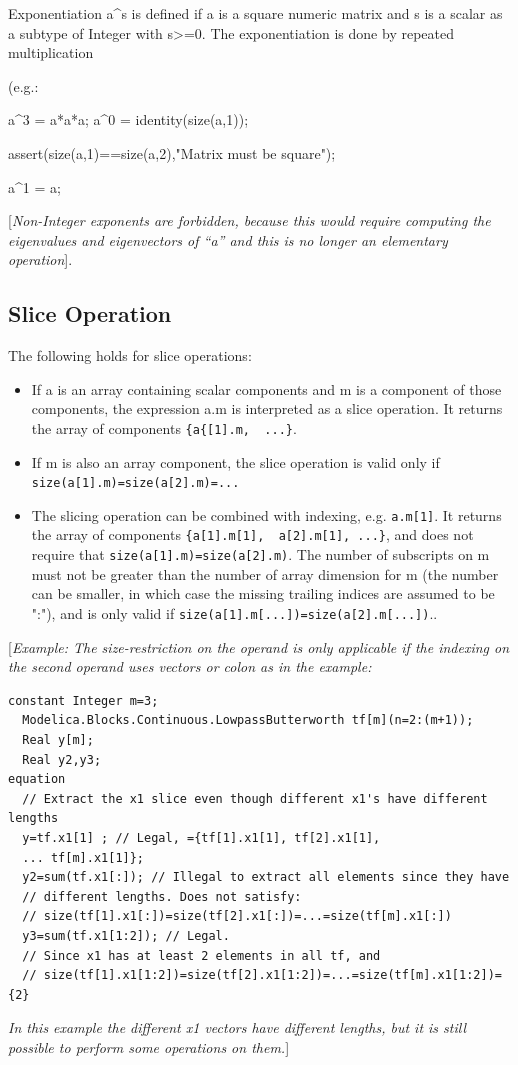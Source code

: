 \documentclass[10pt,a4paper]{report}
\def\doublelabel#1{\label{#1}}
\begin{document}
Exponentiation a\^{}s is defined if a is a square numeric matrix and s
is a scalar as a subtype of Integer with s\textgreater{}=0. The
exponentiation is done by repeated multiplication

(e.g.:

a\^{}3 = a*a*a; a\^{}0 = identity(size(a,1));

assert(size(a,1)==size(a,2),"Matrix must be square");

a\^{}1 = a;

{[}\emph{Non-Integer exponents are forbidden, because this would require
computing the eigenvalues and eigenvectors of ``a'' and this is no
longer an elementary operation}{]}.

\subsection{Slice Operation}\doublelabel{slice-operation}

The following holds for slice operations:

\begin{itemize}
\item
  If a is an array containing scalar components and m is a component of
  those components, the expression a.m is interpreted as a slice operation. It returns the array of components \lstinline!{a{[1].m,  ...}!.
\item
  If m is also an array component, the slice operation is valid only if \lstinline!size(a[1].m)=size(a[2].m)=...!
\item
  The slicing operation can be combined with indexing, e.g. \lstinline!a.m[1]!.
  It returns the array of components  \lstinline!{a[1].m[1],  a[2].m[1], ...}!, and does not require that
   \lstinline!size(a[1].m)=size(a[2].m)!. The number of subscripts on m must
  not be greater than the number of array dimension for m (the number
  can be smaller, in which case the missing trailing indices are assumed
  to be ":"), and is only valid if   \lstinline!size(a[1].m[...])=size(a[2].m[...])!..
\end{itemize}

{[}\emph{Example: The size-restriction on the operand is only applicable
if the indexing on the second operand uses vectors or colon as in the
example:}

\begin{lstlisting}[language=modelica]
  constant Integer m=3;
  Modelica.Blocks.Continuous.LowpassButterworth tf[m](n=2:(m+1));
  Real y[m];
  Real y2,y3;
equation
  // Extract the x1 slice even though different x1's have different lengths
  y=tf.x1[1] ; // Legal, ={tf[1].x1[1], tf[2].x1[1],
  ... tf[m].x1[1]};
  y2=sum(tf.x1[:]); // Illegal to extract all elements since they have
  // different lengths. Does not satisfy:
  // size(tf[1].x1[:])=size(tf[2].x1[:])=...=size(tf[m].x1[:])
  y3=sum(tf.x1[1:2]); // Legal.
  // Since x1 has at least 2 elements in all tf, and
  // size(tf[1].x1[1:2])=size(tf[2].x1[1:2])=...=size(tf[m].x1[1:2])={2}
\end{lstlisting}
\emph{In this example the different x1 vectors have different lengths,
but it is still possible to perform some operations on them.}{]}
\end{document}
